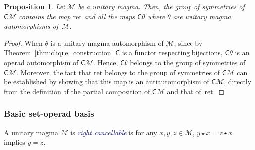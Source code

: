 \documentclass[10pt,reqno]{amsart}
\numberwithin{equation}{subsection}
\newtheorem{Proposition}[Theorem]{Proposition}
\newcommand{\Mca}{\mathcal{M}}
\newcommand{\Cli}{\mathsf{C}}
\newcommand{\Op}{\star}
\newcommand{\Returned}{\mathrm{ret}}
\newcommand{\Def}[1]{\textcolor{MidnightBlue}{\em #1}}
\begin{document}
\begin{Proposition} \label{prop:symmetries_Cli_M}
    Let $\Mca$ be a unitary magma. Then, the group of symmetries of
    $\Cli\Mca$ contains the map $\Returned$ and all the maps
    $\Cli\theta$ where $\theta$ are unitary magma automorphisms
    of~$\Mca$.
\end{Proposition}
\begin{proof}
    When $\theta$ is a unitary magma automorphism of $\Mca$, since by
    Theorem~\ref{thm:clique_construction} $\Cli$ is a functor
    respecting bijections, $\Cli\theta$ is an operad automorphism of
    $\Cli\Mca$. Hence, $\Cli\theta$ belongs to the group of symmetries
    of $\Cli\Mca$. Moreover, the fact that $\Returned$ belongs to the
    group of symmetries of $\Cli\Mca$ can be established by showing that
    this map is an antiautomorphism of $\Cli\Mca$, directly from the
    definition of the partial composition of $\Cli\Mca$ and that
    of~$\Returned$.
\end{proof}
\medskip

\subsubsection{Basic set-operad basis}
A unitary magma $\Mca$ is \Def{right cancellable} is for any
$x, y, z \in \Mca$, $y \Op x = z \Op x$ implies $y = z$.
\medskip
\end{document}
